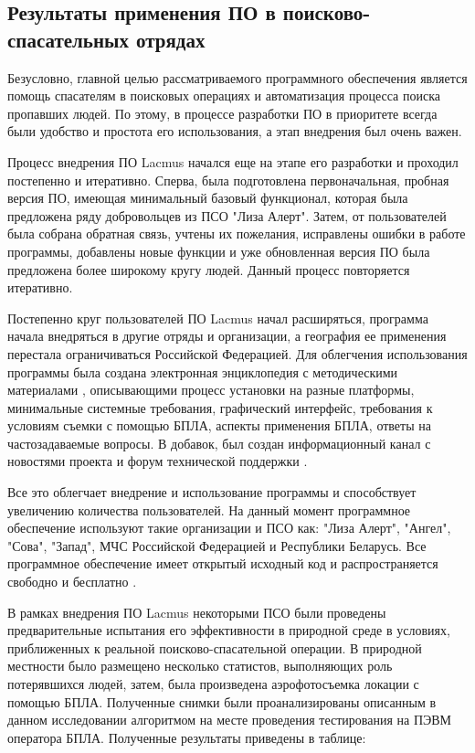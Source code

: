 \subsection{Результаты применения ПО в поисково-спасательных отрядах}\label{sect-8}

Безусловно, главной целью рассматриваемого программного обеспечения является помощь спасателям в поисковых операциях и автоматизация процесса поиска пропавших людей. По этому, в процессе разработки ПО в приоритете всегда были удобство и простота его использования, а этап внедрения был очень важен.

Процесс внедрения ПО Lacmus начался еще на этапе его разработки и проходил постепенно и итеративно. Сперва, была подготовлена первоначальная, пробная версия ПО, имеющая минимальный базовый функционал, которая была предложена ряду добровольцев из ПСО "Лиза Алерт". Затем, от пользователей была собрана обратная связь, учтены их пожелания, исправлены ошибки в работе программы, добавлены новые функции и уже обновленная версия ПО была предложена более широкому кругу людей. Данный процесс повторяется итеративно. 

Постепенно круг пользователей ПО Lacmus начал расширяться, программа начала внедряться в другие отряды и организации, а география ее применения перестала ограничиваться Российской Федерацией. Для облегчения использования программы была создана электронная энциклопедия с методическими материалами \cite{lib-lacmus-wiki}, описывающими процесс установки на разные платформы, минимальные системные требования, графический интерфейс, требования к условиям съемки с помощью БПЛА, аспекты применения БПЛА, ответы на частозадаваемые вопросы. В добавок, был создан информационный канал с новостями проекта \cite{lib-lacmus-news} и форум технической поддержки \cite{lib-lacmus-chat}.

Все это облегчает внедрение и использование программы и способствует увеличению количества пользователей. На данный момент программное обеспечение используют такие организации и ПСО как: "Лиза Алерт", "Ангел", "Сова", "Запад", МЧС Российской Федерацией и Республики Беларусь. Все программное обеспечение имеет открытый исходный код и распространяется свободно и бесплатно \cite{lib-lacmus} \cite{lib-lacmus-app}.

В рамках внедрения ПО Lacmus некоторыми ПСО были проведены предварительные испытания его эффективности в природной среде в условиях, приближенных к реальной поисково-спасательной операции. В природной местности было размещено несколько статистов, выполняющих роль потерявшихся людей, затем, была произведена аэрофотосъемка локации с помощью БПЛА. Полученные снимки были проанализированы описанным в данном исследовании алгоритмом на месте проведения тестирования на ПЭВМ оператора БПЛА. Полученные результаты приведены в таблице:

